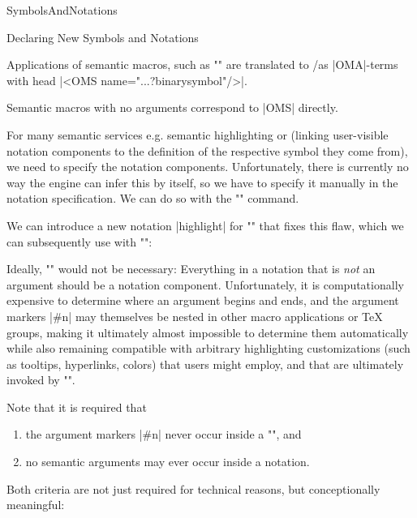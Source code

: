 \begin{smodule}[ns=https://github.com/slatex/sTeX/doc]{SymbolsAndNotations}
\begin{sfragment}{Declaring New Symbols and Notations}
\begin{function}{\notation}
\end{function}

\begin{mmtbox}
  Applications of semantic macros, such as \stexcode"" are translated
  to \mmt/\omdoc as |OMA|-terms with head |<OMS name="...?binarysymbol"/>|.

  Semantic macros with no arguments correspond to |OMS| directly.
\end{mmtbox}

\begin{function}{\comp}
  For many semantic services e.g. semantic highlighting or  (linking
  user-visible notation components to the definition of the respective symbol they come
  from), we need to specify the notation components. Unfortunately, there is currently no
  way the \sTeX engine can infer this by itself, so we have to specify it manually in the
  notation specification.  We can do so with the \stexcode"\comp" command.
\end{function}

We can introduce a new notation |highlight| for \stexcode"\binarysymbol" that fixes this
flaw, which we can subsequently use with \stexcode"\binarysymbol[highlight]":


\begin{dangerbox}
  Ideally, \stexcode"\comp" would not be necessary: Everything in a notation that is
  \emph{not} an argument should be a notation component. Unfortunately, it is
  computationally expensive to determine where an argument begins and ends, and the
  argument markers |#n| may themselves be nested in other macro applications or
  \TeX\xspace groups, making it ultimately almost impossible to determine them
  automatically while also remaining compatible with arbitrary highlighting customizations
  (such as tooltips, hyperlinks, colors) that users might employ, and that are ultimately
  invoked by \stexcode"\comp".
\end{dangerbox}

\begin{dangerbox}
  Note that it is required that
  \begin{enumerate}
  \item the argument markers |#n| never occur inside a \stexcode"\comp", and
  \item no semantic arguments may ever occur inside a notation.
  \end{enumerate}
  Both criteria are not just required for technical reasons, but conceptionally
  meaningful:
        

\end{dangerbox}
\end{sfragment}
\end{smodule}
